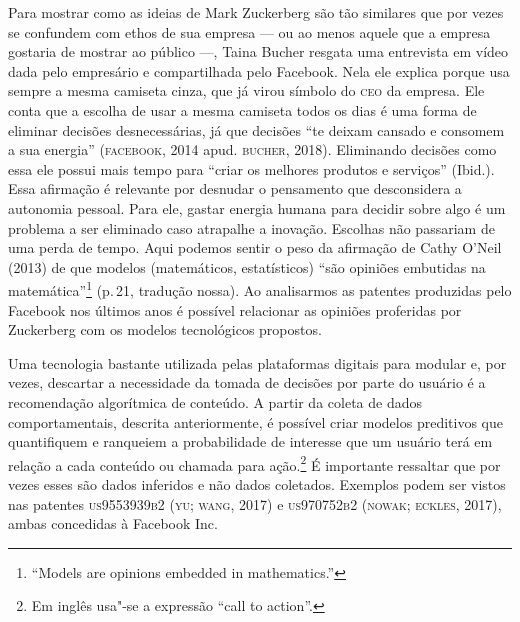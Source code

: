 Para mostrar como as ideias de Mark Zuckerberg são tão similares que por
vezes se confundem com ethos de sua empresa --- ou ao menos aquele que a
empresa gostaria de mostrar ao público ---, Taina Bucher resgata uma
entrevista em vídeo dada pelo empresário e compartilhada pelo Facebook.
Nela ele explica porque usa sempre a mesma camiseta cinza, que já virou
símbolo do \textsc{ceo} da empresa. Ele conta que a escolha de usar a mesma
camiseta todos os dias é uma forma de eliminar decisões desnecessárias,
já que decisões ``te deixam cansado e consomem a sua energia''
(\textsc{facebook}, 2014 apud. \textsc{bucher}, 2018). Eliminando decisões como essa ele
possui mais tempo para ``criar os melhores produtos e serviços''
(Ibid.). Essa afirmação é relevante por desnudar o pensamento que
desconsidera a autonomia pessoal. Para ele, gastar energia humana para
decidir sobre algo é um problema a ser eliminado caso atrapalhe a
inovação. Escolhas não passariam de uma perda de tempo. Aqui podemos
sentir o peso da afirmação de Cathy O'Neil (2013) de que modelos
(matemáticos, estatísticos) ``são opiniões embutidas na
matemática''\footnote{``Models are opinions embedded in mathematics.''}
(p.\,21, tradução nossa). Ao analisarmos as patentes produzidas pelo
Facebook nos últimos anos é possível relacionar as opiniões proferidas
por Zuckerberg com os modelos tecnológicos propostos.

Uma tecnologia bastante utilizada pelas plataformas digitais para
modular e, por vezes, descartar a necessidade da tomada de decisões por
parte do usuário é a recomendação algorítmica de conteúdo. A partir da
coleta de dados comportamentais, descrita anteriormente, é possível
criar modelos preditivos que quantifiquem e ranqueiem a probabilidade de
interesse que um usuário terá em relação a cada conteúdo ou chamada para
ação.\footnote{Em inglês usa"-se a expressão ``call to action''.} É
importante ressaltar que por vezes esses são dados inferidos e não dados
coletados. Exemplos podem ser vistos nas patentes \textsc{us9553939b2} (\textsc{yu; wang},
2017) e \textsc{us970752b2} (\textsc{nowak; eckles}, 2017), ambas concedidas à Facebook
Inc.

